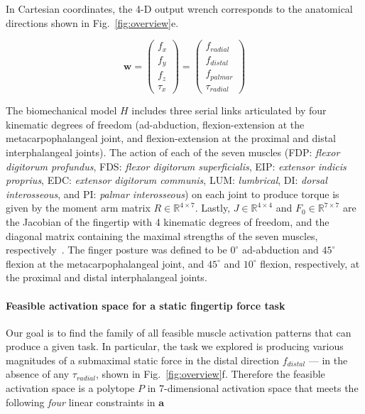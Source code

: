 \documentclass[9pt,twocolumn,twoside,lineno]{pnas-new}
\begin{document}
{In Cartesian coordinates, the 4-D output wrench corresponds to the anatomical directions shown in Fig.~\ref{fig:overview}e.

\begin{equation}
\label{eq:wc}
\textbf{w}=
\begin{pmatrix}
f_{x}\\
f_{y}\\
f_{z}\\
\tau_{x}
\end{pmatrix} =
\begin{pmatrix}
f_{radial}\\
f_{distal}\\
f_{palmar}\\
\tau_{radial}
\end{pmatrix}
\end{equation}




The biomechanical model $H$ includes three serial links articulated by four kinematic degrees of freedom (ad-abduction, flexion-extension at the metacarpophalangeal joint, and flexion-extension at the proximal and distal interphalangeal joints). The action of each of the seven muscles (FDP: \emph{flexor digitorum profundus}, FDS: \emph{flexor digitorum superficialis}, EIP: \emph{extensor indicis proprius}, EDC: \emph{extensor digitorum communis}, LUM: \emph{lumbrical}, DI: \emph{dorsal interosseous}, and PI: \emph{palmar interosseous}) on each joint to produce torque is given by the moment arm matrix $R \in \mathbb{R}^{4 \times 7}$. Lastly, $J \in \mathbb{R}^{4 \times 4}$ and $F_0 \in \mathbb{R}^{7 \times 7}$ are the Jacobian of the fingertip with 4 kinematic degrees of freedom, and the diagonal matrix containing the maximal strengths of the seven muscles, respectively~\cite{valero-cuevas2015fundamentals,Valero-Cuevas2000Scaling}. The finger posture was defined to be $0^\circ$ ad-abduction and $45^\circ$ flexion at the metacarpophalangeal joint, and $45^\circ$ and $10^\circ$ flexion, respectively, at the proximal and distal interphalangeal joints.

\paragraph*{Feasible activation space for a static fingertip force task}

Our goal is to find the family of all feasible muscle activation patterns that can produce a given task. In particular, the task we explored is producing various magnitudes of a submaximal static force in the distal direction $f_{distal}$ --- in the absence of any $\tau_{radial}$, shown in Fig.~\ref{fig:overview}f. Therefore the feasible activation space is a polytope $P$ in 7-dimensional activation space that meets the following \emph{four} linear constraints in $\textbf{a}$~\cite{Valero-Cuevas1998Large,valero-cuevas2015fundamentals,Valero-Cuevas2000Scaling}

}
\end{document}
